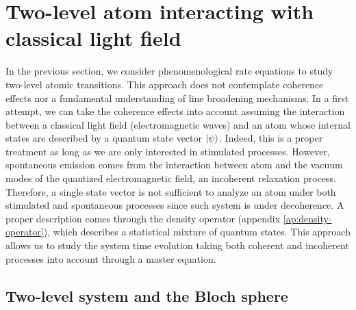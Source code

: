 %
\section{Two-level atom interacting with classical light field}
\label{sec:two-level-atom}
%

In the previous section, we consider phenomenological rate equations to study two-level atomic transitions. This approach does not contemplate coherence effects nor a fundamental understanding of line broadening mechanisms. In a first attempt, we can take the coherence effects into account assuming the interaction between a classical light field (electromagnetic waves) and an atom whose internal states are described by a quantum state vector $ \ket{\psi} $. Indeed, this is a proper treatment as long as we are only interested in stimulated processes. However, spontaneous emission comes from the interaction between atom and the vacuum modes of the quantized electromagnetic field, an incoherent relaxation process. Therefore, a single state vector is not sufficient to analyze an atom under both stimulated and spontaneous processes since such system is under decoherence. A proper description comes through the density operator (appendix \ref{ap:density-operator}), which describes a statistical mixture of quantum states. This approach allows us to study the system time evolution taking both coherent and incoherent processes into account through a master equation.

%
\subsection{Two-level system and the Bloch sphere}
\label{sec:two-level-system-Bloch-sphere}
%

